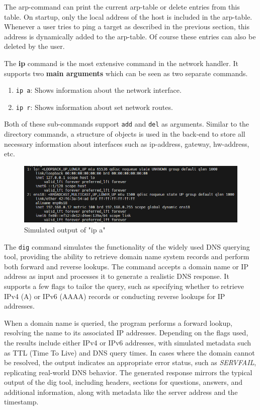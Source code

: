 The arp-command can print the current arp-table or delete entries from this table. On startup, only the local address of the host is included in the arp-table. Whenever a user tries to ping a target as described in the previous section, this address is dynamically added to the arp-table. Of course these entries can also be deleted by the user.

The \textbf{ip} command is the most extensive command in the network handler.
It supports two \textbf{main arguments} which can be seen as two separate commands.

\begin{enumerate}
    \item \texttt{ip a}: Shows information about the network interface. 
    \item \texttt{ip r}: Shows information about set network routes.
\end{enumerate}

Both of these sub-commands support \texttt{add} and \texttt{del} as arguments.
Similar to the directory commands, a structure of objects is used in the back-end to store all necessary information about interfaces such as ip-address, gateway, hw-address, etc.

\begin{figure}[H]
    \centering
    \includegraphics[width=1\linewidth]{bilder/ip.png}
    \caption{Simulated output of "ip a"}
\end{figure}

The \texttt{dig} command simulates the functionality of the widely used DNS querying tool, providing the ability to retrieve domain name system records and perform both forward and reverse lookups. The command accepts a domain name or IP address as input and processes it to generate a realistic DNS response. It supports a few flags to tailor the query, such as specifying whether to retrieve IPv4 (A) or IPv6 (AAAA) records or conducting reverse lookups for IP addresses.

When a domain name is queried, the program performs a forward lookup, resolving the name to its associated IP addresses. Depending on the flags used, the results include either IPv4 or IPv6 addresses, with simulated metadata such as TTL (Time To Live) and DNS query times. In cases where the domain cannot be resolved, the output indicates an appropriate error status, such as \textit{SERVFAIL}, replicating real-world DNS behavior. The generated response mirrors the typical output of the dig tool, including headers, sections for questions, answers, and additional information, along with metadata like the server address and the timestamp.

